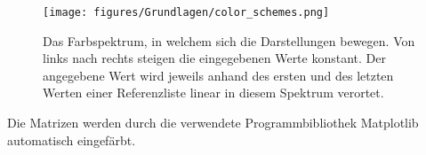 \begin{figure}
    \centering
    \texttt{[image: figures/Grundlagen/color\_schemes.png]}
    \caption{Das Farbspektrum, in welchem sich die Darstellungen bewegen. Von links nach rechts steigen die eingegebenen Werte konstant. Der angegebene Wert wird jeweils anhand des ersten und des letzten Werten einer Referenzliste linear in diesem Spektrum verortet.}
    \label{fig:color_schemes}
\end{figure}

Die Matrizen werden durch die verwendete Programmbibliothek \glqq{}Matplotlib\grqq{} automatisch eingefärbt.